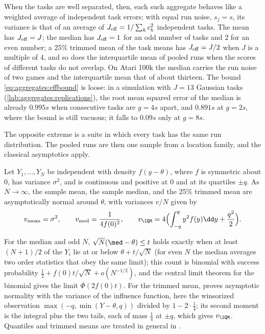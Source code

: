 \begin{refsection}
When the tasks are well separated, then, each such aggregate behaves like a weighted average of independent task errors; with equal run noise, $s_j=s$, its variance is that of an average of $J_{\mathrm{eff}}=1/\sum_kc_k^2$ independent tasks. The mean has $J_{\mathrm{eff}}=J$; the median has $J_{\mathrm{eff}}=1$ for an odd number of tasks and $2$ for an even number; a 25\% trimmed mean of the task means has $J_{\mathrm{eff}}=J/2$ when $J$ is a multiple of $4$, and so does the interquartile mean of pooled runs when the scores of different tasks do not overlap. On Atari 100k the median carries the run noise of two games and the interquartile mean that of about thirteen. The bound \eqref{eq:aggregates:effbound} is loose: in a simulation with $J=13$ Gaussian tasks (\cref{lab:aggregates:replications}), the root mean squared error of the median is already $0.995s$ when consecutive tasks are $g=4s$ apart, and $0.891s$ at $g=2s$, where the bound is still vacuous; it falls to $0.09s$ only at $g=8s$.

The opposite extreme is a suite in which every task has the same run distribution. The pooled runs are then one sample from a location family, and the classical asymptotics apply.

\begin{proposition}\label{prop:aggregates:location}
Let $Y_1,\dots,Y_N$ be independent with density $f(y-\theta)$, where $f$ is symmetric about $0$, has variance $\sigma^2$, and is continuous and positive at $0$ and at its quartiles $\pm q$. As $N\to\infty$, the sample mean, the sample median, and the 25\% trimmed mean are asymptotically normal around $\theta$, with variances $v/N$ given by
\[
  v_{\mathrm{mean}}=\sigma^2,\qquad v_{\mathrm{med}}=\frac1{4f(0)^2},\qquad v_{\IQM}=4\Bigl(\int_{-q}^{q}y^2f(y)\dd y+\frac{q^2}2\Bigr).
\]
\end{proposition}

\begin{proofsketch}
For the median and odd $N$, $\sqrt N(\med-\theta)\le t$ holds exactly when at least $(N+1)/2$ of the $Y_i$ lie at or below $\theta+t/\sqrt N$ (for even $N$ the median averages two order statistics that obey the same limit); this count is binomial with success probability $\frac12+f(0)t/\sqrt N+o(N^{-1/2})$, and the central limit theorem for the binomial gives the limit $\Phi(2f(0)t)$. For the trimmed mean, \textcite{Stigler1973} proves asymptotic normality with the variance of the influence function, here the winsorized observation $\max(-q,\min(Y-\theta,q))$ divided by $1-2\cdot\frac14$; its second moment is the integral plus the two tails, each of mass $\frac14$ at $\pm q$, which gives $v_{\IQM}$. Quantiles and trimmed means are treated in general in \textcite[Chapters~21--22]{vanderVaart1998}.
\end{proofsketch}


\end{refsection}
